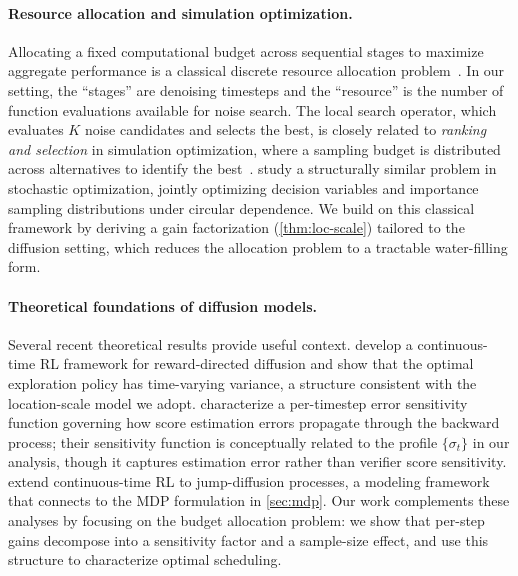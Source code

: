 \paragraph{Resource allocation and simulation optimization.}
Allocating a fixed computational budget across sequential stages to maximize
aggregate performance is a classical discrete resource allocation
problem~\citep{ibaraki1988resource}.
In our setting, the ``stages'' are denoising timesteps and the ``resource'' is
the number of function evaluations available for noise search.
The local search operator, which evaluates $K$ noise candidates and selects the
best, is closely related to \emph{ranking and selection} in simulation
optimization, where a sampling budget is distributed across alternatives to
identify the best~\citep{chen2000simulation}.
\citet{lam2025importance} study a structurally similar problem in stochastic
optimization, jointly optimizing decision variables and importance sampling
distributions under circular dependence.
We build on this classical framework by deriving a gain factorization
(\cref{thm:loc-scale}) tailored to the diffusion setting, which reduces
the allocation problem to a tractable water-filling form.

\paragraph{Theoretical foundations of diffusion models.}
Several recent theoretical results provide useful context.
\citet{gao2024reward} develop a continuous-time RL framework for
reward-directed diffusion and show that the optimal exploration
policy has time-varying variance, a structure consistent with the
location-scale model we adopt.
\citet{tang2024contractive} characterize a per-timestep error sensitivity
function governing how score estimation errors propagate through the backward
process; their sensitivity function is conceptually related to the profile
$\{\sigma_t\}$ in our analysis, though it captures estimation error
rather than verifier score sensitivity.
\citet{zhou2024jumpdiffusion} extend continuous-time RL to jump-diffusion
processes, a modeling framework that connects to the MDP formulation
in \cref{sec:mdp}.
Our work complements these analyses by focusing on the budget allocation
problem: we show that per-step gains decompose into a sensitivity factor
and a sample-size effect, and use this structure to characterize optimal
scheduling.
